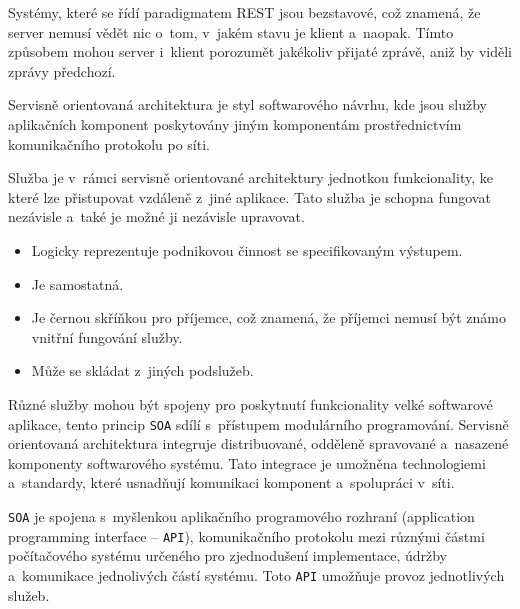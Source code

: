 \documentclass[twoside, 12pt]{article}
\begin{document}
{


Systémy, které se řídí paradigmatem REST jsou bezstavové, což znamená,
že server nemusí vědět nic o~tom, v~jakém stavu je klient a~naopak.
Tímto způsobem mohou server i~klient porozumět  jakékoliv přijaté zprávě,
aniž by viděli zprávy předchozí.
\cite{codecademyRest}

Servisně orientovaná architektura je styl softwarového návrhu,
kde jsou služby aplikačních komponent poskytovány jiným komponentám
prostřednictvím komunikačního protokolu po síti.

Služba je v~rámci servisně orientované architektury jednotkou funkcionality,
ke které lze přistupovat vzdáleně z~jiné aplikace.
Tato služba je schopna fungovat nezávisle a~také je možné ji nezávisle upravovat.

\bigskip


\begin{itemize}

\item Logicky reprezentuje podnikovou činnost se specifikovaným výstupem.

\item Je samostatná.

\item Je černou skříňkou pro příjemce, což znamená,
že příjemci nemusí být známo vnitřní fungování služby.

\item Může se skládat z~jiných podslužeb.

\end{itemize}

Různé služby mohou být spojeny pro poskytnutí funkcionality velké softwarové aplikace,
tento princip \texttt{SOA} sdílí s~přístupem modulárního programování.
Servisně orientovaná architektura integruje distribuované,
odděleně spravované a~nasazené komponenty softwarového systému.
Tato integrace je umožněna technologiemi a~standardy, které usnadňují
komunikaci komponent a~spolupráci v~síti.

\texttt{SOA} je spojena s~myšlenkou aplikačního programového rozhraní
(application programming interface -- \texttt{API}), komunikačního protokolu mezi
různými částmi počítačového systému určeného pro zjednodušení implementace,
údržby a~komunikace jednolivých částí systému.
Toto \texttt{API} umožňuje provoz jednotlivých služeb.

}
\end{document}
